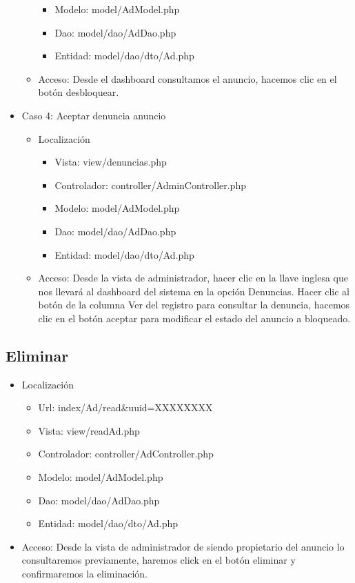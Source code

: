\begin{itemize}
\begin{itemize}
\begin{itemize}
\item Modelo: model/AdModel.php
\item Dao: model/dao/AdDao.php
\item Entidad: model/dao/dto/Ad.php
\end{itemize}
\item Acceso: Desde el dashboard consultamos el anuncio, hacemos clic en el bot\'{o}n desbloquear.
\end{itemize}
\item Caso 4: Aceptar denuncia anuncio
\begin{itemize}
\item Localizaci\'{o}n
\begin{itemize}
\item Vista: view/denuncias.php
\item Controlador: controller/AdminController.php
\item Modelo: model/AdModel.php
\item Dao: model/dao/AdDao.php
\item Entidad: model/dao/dto/Ad.php
\end{itemize}
\item Acceso: Desde la vista de administrador, hacer clic en la llave inglesa que nos llevar\'{a} al dashboard del sistema en la opci\'{o}n Denuncias. Hacer clic al bot\'{o}n de la columna Ver del registro para consultar la denuncia, hacemos clic en el bot\'{o}n aceptar para modificar el estado del anuncio a bloqueado.
\end{itemize}
\end{itemize}

\subsection{Eliminar}
\begin{itemize}
\item Localizaci\'{o}n
\begin{itemize}
\item Url: index/Ad/read\&uuid=XXXXXXXX
\item Vista: view/readAd.php
\item Controlador: controller/AdController.php
\item Modelo: model/AdModel.php
\item Dao: model/dao/AdDao.php
\item Entidad: model/dao/dto/Ad.php
\end{itemize}
\item Acceso: Desde la vista de administrador de siendo propietario del anuncio lo consultaremos previamente, haremos click en el bot\'{o}n eliminar y confirmaremos la eliminaci\'{o}n.
\end{itemize}
